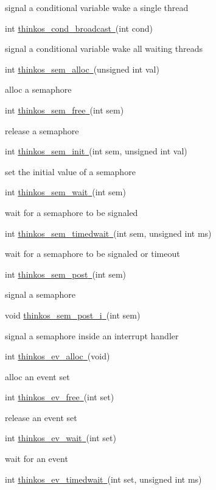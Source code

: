 {{signal a conditional variable wake a single thread }

{int
}{\protect\hyperlink{h.1pxezwc}{thinkos\_cond\_broadcast}}{\protect\hyperlink{h.1pxezwc}{~}}{(int
cond)}

{signal a conditional variable wake all waiting threads }

{int
}{\protect\hyperlink{h.2p2csry}{thinkos\_sem\_alloc}}{\protect\hyperlink{h.2p2csry}{~}}{(unsigned
int val)}

{alloc a semaphore }

{int
}{\protect\hyperlink{h.147n2zr}{thinkos\_sem\_free}}{\protect\hyperlink{h.147n2zr}{~}}{(int
sem)}

{release a semaphore }

{int
}{\protect\hyperlink{h.3o7alnk}{thinkos\_sem\_init}}{\protect\hyperlink{h.3o7alnk}{~}}{(int
sem, unsigned int val)}

{set the initial value of a semaphore }

{int
}{\protect\hyperlink{h.23ckvvd}{thinkos\_sem\_wait}}{\protect\hyperlink{h.23ckvvd}{~}}{(int
sem)}

{wait for a semaphore to be signaled }

{int
}{\protect\hyperlink{h.ihv636}{thinkos\_sem\_timedwait}}{\protect\hyperlink{h.ihv636}{~}}{(int
sem, unsigned int ms)}

{wait for a semaphore to be signaled or timeout }

{int
}{\protect\hyperlink{h.32hioqz}{thinkos\_sem\_post}}{\protect\hyperlink{h.32hioqz}{~}}{(int
sem)}

{signal a semaphore }

{void
}{\protect\hyperlink{h.1hmsyys}{thinkos\_sem\_post\_i}}{\protect\hyperlink{h.1hmsyys}{~}}{(int
sem)}

{signal a semaphore inside an interrupt handler }

{int
}{\protect\hyperlink{h.2grqrue}{thinkos\_ev\_alloc}}{\protect\hyperlink{h.2grqrue}{~}}{(void)}

{alloc an event set }

{int
}{\protect\hyperlink{h.vx1227}{thinkos\_ev\_free}}{\protect\hyperlink{h.vx1227}{~}}{(int
set)}

{release an event set }

{int
}{\protect\hyperlink{h.3fwokq0}{thinkos\_ev\_wait}}{\protect\hyperlink{h.3fwokq0}{~}}{(int
set)}

{wait for an event }

{int
}{\protect\hyperlink{h.1v1yuxt}{thinkos\_ev\_timedwait}}{\protect\hyperlink{h.1v1yuxt}{~}}{(int
set, unsigned int ms)}

}
